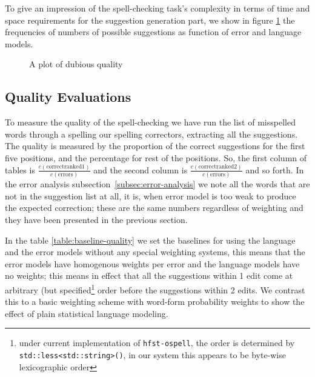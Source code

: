 \documentclass[a4paper,12pt]{article}
\begin{document}
To give an impression of the spell-checking task's complexity in terms of time
and space requirements for the suggestion generation part, we show in figure
\ref{fig:coverage} the frequencies of numbers of possible suggestions as
function of error and language models.

\begin{figure}
    \centering
    \caption{A plot of dubious quality
    \label{fig:coverage}}
\end{figure}

\subsection{Quality Evaluations}

To measure the quality of the spell-checking we have run the list of misspelled
words through a spelling our spelling correctors, extracting all the
suggestions.  The quality is measured by the proportion of the correct
suggestions for the first five positions, and the percentage for rest of the
positions. So, the first column of tables is $\frac{c(\mathrm{correct ranked
1})}{c(\mathrm{errors})}$ and the second column is $\frac{c(\mathrm{correct
ranked 2})}{c(\mathrm{errors})}$ and so forth.  In the error analysis
subsection~\ref{subsec:error-analysis} we note all the words that are not in
the suggestion list at all, it is, when error model is too weak to produce the
expected correction; these are the same numbers regardless of weighting and
they have been presented in the previous section.

In the table \ref{table:baseline-quality} we set the baselines for using the
language and the error models without any special weighting systems, this means
that the error models have homogenous weights per error and the language models
have no weights; this means in effect that all the suggestions within 1 edit
come at arbitrary (but specified\footnote{under current implementation of
\texttt{hfst-ospell}, the order is determined by
\texttt{std::less<std::string>()}, in our system this appears to be byte-wise
lexicographic order} order before the suggestions within 2 edits.  We contrast
this to a basic weighting scheme with word-form probability weights to show the
effect of plain statistical language modeling.
\end{document}

